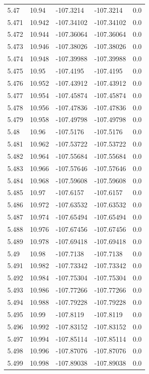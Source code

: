 \begin{tabular}{lllll}
5.47 & 10.94 & -107.3214 & -107.3214 & 0.0 \\
5.471 & 10.942 & -107.34102 & -107.34102 & 0.0 \\
5.472 & 10.944 & -107.36064 & -107.36064 & 0.0 \\
5.473 & 10.946 & -107.38026 & -107.38026 & 0.0 \\
5.474 & 10.948 & -107.39988 & -107.39988 & 0.0 \\
5.475 & 10.95 & -107.4195 & -107.4195 & 0.0 \\
5.476 & 10.952 & -107.43912 & -107.43912 & 0.0 \\
5.477 & 10.954 & -107.45874 & -107.45874 & 0.0 \\
5.478 & 10.956 & -107.47836 & -107.47836 & 0.0 \\
5.479 & 10.958 & -107.49798 & -107.49798 & 0.0 \\
5.48 & 10.96 & -107.5176 & -107.5176 & 0.0 \\
5.481 & 10.962 & -107.53722 & -107.53722 & 0.0 \\
5.482 & 10.964 & -107.55684 & -107.55684 & 0.0 \\
5.483 & 10.966 & -107.57646 & -107.57646 & 0.0 \\
5.484 & 10.968 & -107.59608 & -107.59608 & 0.0 \\
5.485 & 10.97 & -107.6157 & -107.6157 & 0.0 \\
5.486 & 10.972 & -107.63532 & -107.63532 & 0.0 \\
5.487 & 10.974 & -107.65494 & -107.65494 & 0.0 \\
5.488 & 10.976 & -107.67456 & -107.67456 & 0.0 \\
5.489 & 10.978 & -107.69418 & -107.69418 & 0.0 \\
5.49 & 10.98 & -107.7138 & -107.7138 & 0.0 \\
5.491 & 10.982 & -107.73342 & -107.73342 & 0.0 \\
5.492 & 10.984 & -107.75304 & -107.75304 & 0.0 \\
5.493 & 10.986 & -107.77266 & -107.77266 & 0.0 \\
5.494 & 10.988 & -107.79228 & -107.79228 & 0.0 \\
5.495 & 10.99 & -107.8119 & -107.8119 & 0.0 \\
5.496 & 10.992 & -107.83152 & -107.83152 & 0.0 \\
5.497 & 10.994 & -107.85114 & -107.85114 & 0.0 \\
5.498 & 10.996 & -107.87076 & -107.87076 & 0.0 \\
5.499 & 10.998 & -107.89038 & -107.89038 & 0.0 \\

\end{tabular}
